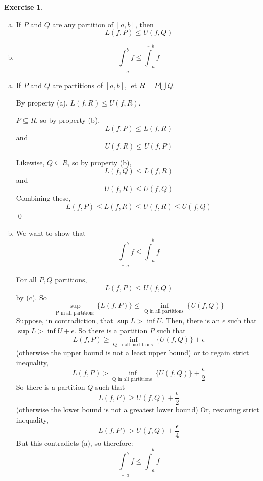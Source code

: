 \documentclass[11pt,oneside]{article}
\numberwithin{equation}{section}
\theoremstyle{definition}
\newtheorem{exercise}{Exercise}
\begin{document}
\begin{exercise}
  \begin{enumerate}[(a),start=3]
    \item
    If $P$ and $Q$ are any partition of $[a,b]$, then
    $$
    L(f, P) \leq U(f, Q)
    $$
  \item
    $$
    \underline \int _ {a} ^ {b} f \leq  \overline \int _ {a} ^ {b} f
    $$    
  \end{enumerate}
\end{exercise}
\begin{solution}
  \begin{enumerate}[(a),start=3]
  \item
    If $P$ and $Q$ are partitions of $[a,b]$, let $R = P \bigcup Q$.

    By property (a), $L(f, R) \leq U(f, R)$.

    $ P \subseteq R$, so by property (b),
    $$
    L(f, P) \leq L(f, R)
    $$
    and 
    $$
    U(f, R) \leq U(f, P)
    $$

    Likewise, $ Q \subseteq R$, so by property (b),
    $$
    L(f, Q) \leq L(f, R)
    $$
    and
    $$ 
    U(f, R) \leq U(f, Q)
    $$
    Combining these,
    $$
    L(f,P) \leq L(f, R) \leq U(f, R) \leq U(f, Q)
    $$
    \qed
  \item

    We want to show that 
    $$ \underline \int _ a ^ b f \leq \overline \int _ a ^ b  f $$

    For all $P, Q$ partitions,
    $$
    L(f,P) \leq U(f, Q)
    $$
    by (c).  So
    $$
    \sup \limits_ {\text{P in all partitions}} \{ L(f, P) \} \leq \inf \limits_{\text{Q in all partitions }} \{ U(f, Q) \}
    $$
    Suppose, in contradiction, that $ \sup L > \inf U$.
    Then, there is an $ \epsilon $ such that $\sup L > \inf U + \epsilon$.
    So there is a partition $P$ such that
    $$
    L(f, P) \geq \inf \limits_{\text{Q in all partitions }} \{ U(f, Q) \} + \epsilon
    $$
    (otherwise the upper bound is not a least upper bound) or to regain strict inequality, 
    $$
    L(f, P) > \inf \limits_{\text{Q in all partitions }} \{ U(f, Q) \} + \frac{\epsilon}{2} 
    $$
    So there is a partition $Q$ such that
    $$
    L(f, P) \geq U(f, Q) + \frac{\epsilon}{2}
    $$
    (otherwise the lower bound is not a greatest lower bound) Or, restoring strict inequality, 
    $$
    L(f, P) >  U(f, Q) + \frac{\epsilon}{4}
    $$
    But this contradicts (a), so therefore:
    $$
    \underline \int _ a ^ b f \leq \overline \int _ a ^ b  f
    $$
    
\end{enumerate}
\end{solution}
\end{document}
